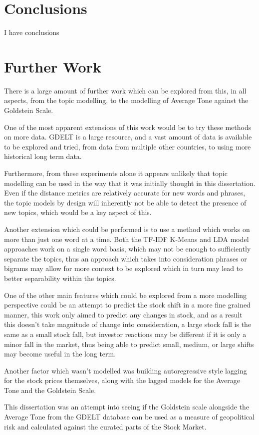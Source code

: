 \section{Conclusions}
I have conclusions




\section{Further Work}
There is a large amount of further work which can be explored from this, in all aspects, from the topic modelling, to the modelling of Average Tone against the Goldstein Scale. 

One of the most apparent extensions of this work would be to try these methods on more data. GDELT is a large resource, and a vast amount of data is available to be explored and tried, from data from multiple other countries, to using more historical long term data. 

Furthermore, from these experiments alone it appears unlikely that topic modelling can be used in the way that it was initially thought in this dissertation. Even if the distance metrics are relatively accurate for new words and phrases, the topic models by design will inherently not be able to detect the presence of new topics, which would be a key aspect of this.

Another extension which could be performed is to use a method which works on more than just one word at a time. Both the TF-IDF K-Means and LDA model approaches work on a single word basis, which may not be enough to sufficiently separate the topics, thus an approach which takes into consideration phrases or bigrams may allow for more context to be explored which in turn may lead to better separability within the topics. 

One of the other main features which could be explored from a more modelling perspective could be an attempt to predict the stock shift in a more fine grained manner, this work only aimed to predict any changes in stock, and as a result this doesn't take magnitude of change into consideration, a large stock fall is the same as a small stock fall, but investor reactions may be different if it is only a minor fall in the market, thus being able to predict small, medium, or large shifts may become useful in the long term. 

Another factor which wasn't modelled was building autoregressive style lagging for the stock prices themselves, along with the lagged models for the Average Tone and the Goldstein Scale. 

This dissertation was an attempt into seeing if the Goldstein scale alongside the Average Tone from the GDELT database can be used as a measure of geopolitical risk and calculated against the curated parts of the Stock Market. 